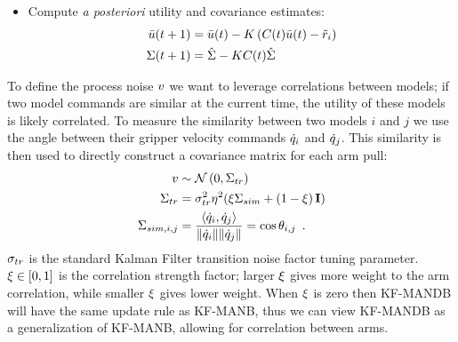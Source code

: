 \begin{algorithm}[h]
\begin{algorithmic}
{\begin{enumerate}
{\begin{itemize}
{\begin{align*}
                                    S                                &= C(t) \hat \utilityprocessnoisecovar C(t)^T + \observationnoisefactor^2 \\
                                    K                                &= \hat \utilityprocessnoisecovar C(t)^T S^{-1}
                                \end{align*}
                            }
                            \item{Compute \textit{a posteriori} utility and covariance estimates:
                                \begin{align*}
                                    \bar {u}(t + 1)             &= \bar {u}(t) - K \left( C(t) \bar {u}(t) - \tilde {r}_i \right) \\
                                    \Sigma(t + 1) &= \hat {\Sigma} - K C(t) \hat {\Sigma}
                                \end{align*}
                            }
                        \end{itemize}
                    }
                \end{enumerate}
            }
        \EndFor
    \end{algorithmic}
\end{algorithm}

To define the process noise $v$ we want to leverage correlations between models; if two model commands are similar at the current time, the utility of these models is likely correlated. To measure the similarity between two models $i$ and $j$ we use the angle between their gripper velocity commands $\dot{q}_{i}$ and $\dot{q}_{j}$. This similarity is then used to directly construct a covariance matrix for each arm pull:
{\begin{equation}
\begin{split}
    v            &\sim \mathcal{N}\left(0,\Sigma_{tr}\right)\\
    \Sigma_{tr}  & = \sigma_{tr}^2 \eta^2 (\xi \Sigma_{sim} + \left(1 - \xi\right) \mathbf{I})\\
    \Sigma_{sim,i,j} & = \frac{\langle \dot{q}_{i}, \dot{q}_{j} \rangle}{\| \dot{q}_{i} \| \| \dot{q}_{j} \|} = \cos \theta_{i,j} \enspace.
\label{eqn:processnoise}
\end{split}
\end{equation}}
$\sigma_{tr}$ is the standard Kalman Filter transition noise factor tuning parameter. $\xi \in [0,1]$ is the correlation strength factor; larger $\xi$ gives more weight to the arm correlation, while smaller $\xi$ gives lower weight. When $\xi$ is zero then KF-MANDB will have the same update rule as KF-MANB, thus we can view KF-MANDB as a generalization of KF-MANB, allowing for correlation between arms.

